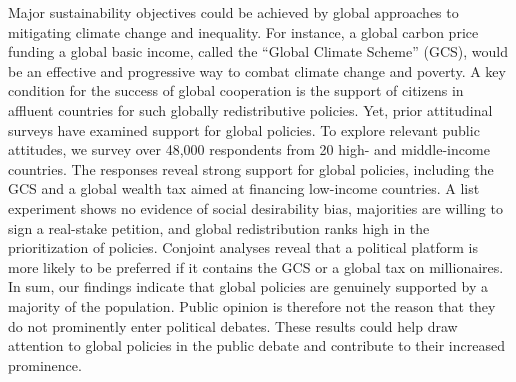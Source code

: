 Major sustainability objectives could be achieved by global approaches to mitigating climate change and inequality. For instance, a global carbon price funding a global basic income, called the “Global Climate Scheme” (GCS), would be an effective and progressive way to combat climate change and poverty. A key condition for the success of global cooperation is the support of citizens in affluent countries for such globally redistributive policies. Yet, prior attitudinal surveys have examined support for global policies. To explore relevant public attitudes, we survey over 48,000 respondents from 20 high- and middle-income countries. The responses reveal strong support for global policies, including the GCS and a global wealth tax aimed at financing low-income countries. A list experiment shows no evidence of social desirability bias, majorities are willing to sign a real-stake petition, and global redistribution ranks high in the prioritization of policies. Conjoint analyses reveal that a political platform is more likely to be preferred if it contains the GCS or a global tax on millionaires. In sum, our findings indicate that global policies are genuinely supported by a majority of the population. Public opinion is therefore not the reason that they do not prominently enter political debates. These results could help draw attention to global policies in the public debate and contribute to their increased prominence.